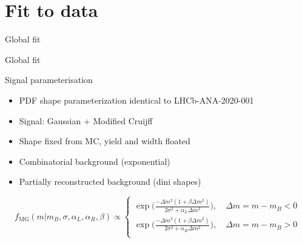 \documentclass{beamer}
\begin{document}
\section{Fit to data}
\begin{frame}{Global fit}
  \begin{center}
    {\huge Global fit}
  \end{center}
\end{frame}

\begin{frame}{Signal parameterisation}
  \begin{itemize}
    \setlength\itemsep{1.2em}
    \item{PDF shape parameterization identical to LHCb-ANA-2020-001}
    \item{Signal: Gaussian + Modified Cruijff}
    \item{Shape fixed from MC, yield and width floated}
    \item{Combinatorial background (exponential)}
    \item{Partially reconstructed background (dini shapes)}
  \end{itemize}
  \vspace{0.5cm}
  \begin{equation*}
    f_\text{MG}(m|m_B, \sigma, \alpha_L, \alpha_R, \beta)\propto
    \begin{cases}
      \exp\Big(\frac{-\Delta m^2(1 + \beta\Delta m^2)}{2\sigma^2 + \alpha_L\Delta m^2}\Big), \quad \Delta m = m - m_B < 0 \\
      \exp\Big(\frac{-\Delta m^2(1 + \beta\Delta m^2)}{2\sigma^2 + \alpha_R\Delta m^2}\Big), \quad \Delta m = m - m_B > 0 \\
    \end{cases}
  \end{equation*}
\end{frame}
\end{document}
